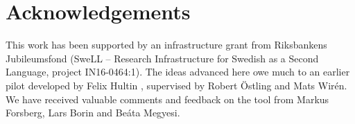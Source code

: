 \documentclass[10pt, a4paper]{article}
\begin{document}



\section{Acknowledgements}

This work has been supported by an infrastructure grant from Riksbankens Jubileumsfond (SweLL -- Research Infrastructure for Swedish as a Second Language, project IN16-0464:1). The ideas advanced here owe much to an earlier pilot developed by Felix Hultin \cite{correctAnnotator}, supervised by Robert Östling and Mats Wirén. We have received valuable comments and feedback on the tool from Markus Forsberg, Lars Borin and Beáta Megyesi.
\end{document}
